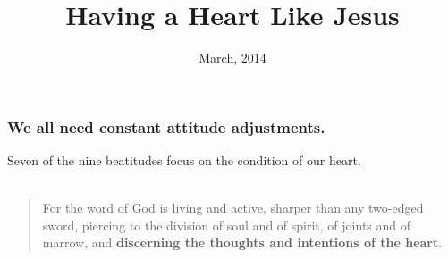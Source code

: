 \documentclass{beamer}
\title{Having a Heart Like Jesus}
\date{March, 2014}
\begin{document}
\frame{\titlepage}


\begin{frame}
\frametitle{We all need constant attitude adjustments.}
Seven of the nine beatitudes focus on the condition of our heart.\\~\\
\begin{quote}
For the word of God is living and active, sharper than any two-edged sword, piercing to the division of soul and of spirit, of joints and of marrow, and \textbf{discerning the thoughts and intentions of the heart}.

\end{quote}


\end{frame}






\end{document}
